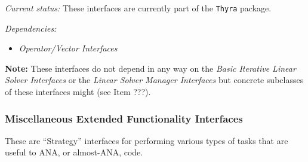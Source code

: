 \documentclass[pdf,ps2pdf,11pt]{SANDreport}
\begin{document}
{}\textit{Current status:} These interfaces are currently part of the
{}\texttt{Thyra} package.

{}\textit{Dependencies:}
\begin{itemize}
\item {}\textit{Operator/Vector Interfaces}
\end{itemize}

{}\textbf{Note:} These interfaces do not depend in any way on the
{}\textit{Basic Iterative Linear Solver Interfaces} or the {}\textit{Linear
Solver Manager Interfaces} but concrete subclasses of these interfaces might
(see Item ???).

%
\subsubsection{Miscellaneous Extended Functionality Interfaces}
%

These are ``Strategy'' interfaces for performing various types of tasks that
are useful to ANA, or almost-ANA, code.
\end{document}
